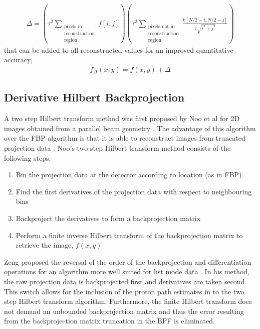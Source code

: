 \documentclass[11pt,a4paper]{article}
\begin{document}
\begin{eqnarray}
\Delta = \left( \tau^2 \sum_{\substack{\text{pixels in}\\\text{reconstruction}\\\text{region}}} f[i,j] \right) \left( \tau^2 \sum_{\substack{\text{pixels not in}\\\text{reconstruction}\\\text{region}}} \frac{k[N/2 - i, N/2 - j]}{\tau\sqrt{i^2 + j^2}}\right)
\label{eq:correction}
\end{eqnarray}
that can be added to all reconstructed values for an improved quantitative accuracy,
\begin{eqnarray}
f_{\Delta}(x,y) = f(x,y) + \Delta
\end{eqnarray}

\subsection{Derivative Hilbert Backprojection}
\label{sec:HBP}
A two step Hilbert transform method was first proposed by Noo et al for 2D images obtained from a parallel beam geometry \parencite{noo2004two}. The advantage of this algorithm over the FBP algorithm is that it is able to reconstruct images from truncated projection data \parencite{defrise2006truncated}. Noo's two step Hilbert transform method consists of the following steps:
\begin{enumerate}
\item Bin the projection data at the detector according to location (as in FBP)
\item Find the first derivatives of the projection data with respect to neighbouring bins
\item Backproject the derivatives to form a backprojection matrix
\item Perform a finite inverse Hilbert transform of the backprojection matrix to retrieve the image, $f(x,y)$
\end{enumerate}
Zeng proposed the reversal of the order of the backprojection and differentiation operations for an algorithm more well suited for list mode data \parencite{zeng2007image}. In his method, the raw projection data is backprojected first and derivatives are taken second. This switch allows for the inclusion of the proton path estimates in to the two step Hilbert transform algorithm. Furthermore, the finite Hilbert transform does not demand an unbounded backprojection matrix and thus the error resulting from the backprojection matrix truncation in the BPF is eliminated.
\end{document}
